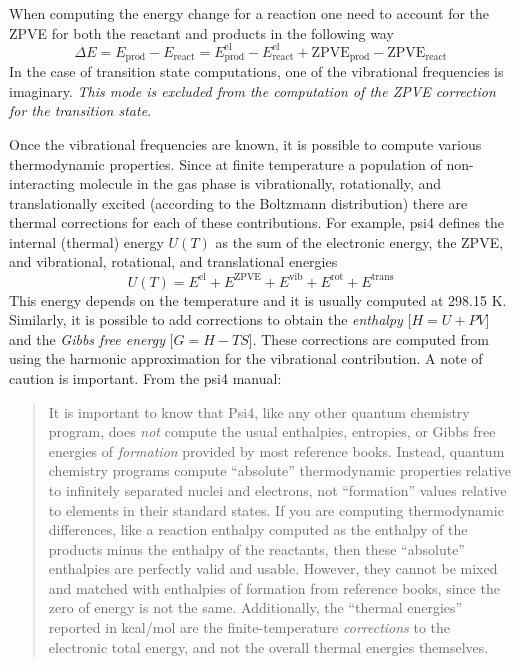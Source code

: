 \documentclass[../Main/chem371-notes.tex]{subfiles}
\begin{document}
When computing the energy change for a reaction one need to account for the ZPVE for both the reactant and products in the following way
\begin{equation}
\Delta E = E_\text{prod} - E_\text{react} = 
E^\text{el}_\text{prod} - E^\text{el}_\text{react}
+ \text{ZPVE}_\text{prod} - \text{ZPVE}_\text{react}
\end{equation}
In the case of transition state computations, one of the vibrational frequencies is imaginary. \emph{This mode is excluded from the computation of the ZPVE correction for the transition state}.

Once the vibrational frequencies are known, it is possible to compute various thermodynamic properties.
Since at finite temperature a population of non-interacting molecule in the gas phase is vibrationally, rotationally, and translationally excited (according to the Boltzmann distribution) there are thermal corrections for each of these contributions.
For example, psi4 defines the internal (thermal) energy $U(T)$ as the sum of the electronic energy, the ZPVE, and vibrational, rotational, and translational energies
\begin{equation}
U(T) = E^{\mathrm{el}} + E^{\mathrm{ZPVE}}
+ E^{\mathrm{vib}} + E^{\mathrm{rot}} + E^{\mathrm{trans}}
\end{equation}
This energy depends on the temperature and it is usually computed at 298.15 K.
Similarly, it is possible to add corrections to obtain the \emph{enthalpy} [$H = U + PV$] and the \emph{Gibbs free energy} [$G = H - TS$].
These corrections are computed from using the harmonic approximation for the vibrational contribution.
A note of caution is important. From the psi4 manual:
\begin{quote}
 It is important to know that Psi4, like any other quantum chemistry program, does \textit{not} compute the usual enthalpies, entropies, or Gibbs free energies of \textit{formation} provided by most reference books. Instead, quantum chemistry programs compute “absolute” thermodynamic properties relative to infinitely separated nuclei and electrons, not “formation” values relative to elements in their standard states. If you are computing thermodynamic differences, like a reaction enthalpy computed as the enthalpy of the products minus the enthalpy of the reactants, then these “absolute” enthalpies are perfectly valid and usable. However, they cannot be mixed and matched with enthalpies of formation from reference books, since the zero of energy is not the same. Additionally, the “thermal energies” reported in kcal/mol are the finite-temperature \textit{corrections} to the electronic total energy, and not the overall thermal energies themselves.
\end{quote}
\end{document}
